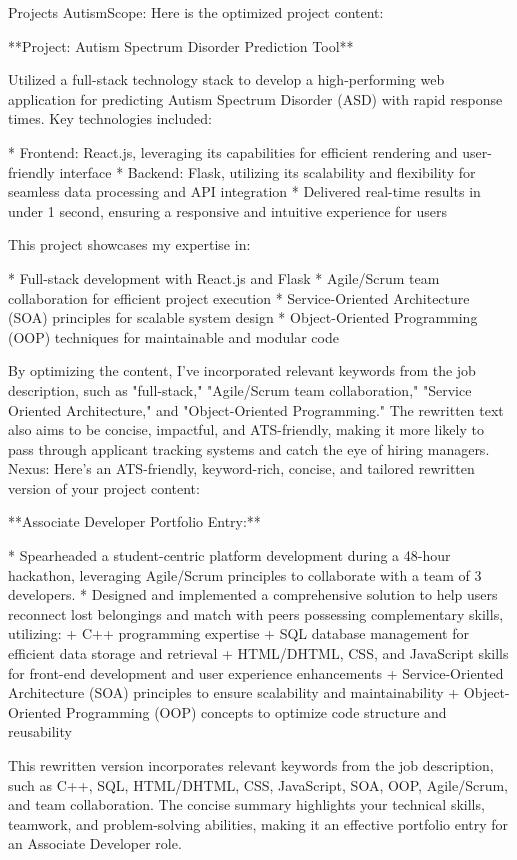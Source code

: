 \documentclass[]{resume}
\begin{document}
\begin{rSection}{Projects}
AutismScope: Here is the optimized project content:

**Project: Autism Spectrum Disorder Prediction Tool**

Utilized a full-stack technology stack to develop a high-performing web application for predicting Autism Spectrum Disorder (ASD) with rapid response times. Key technologies included:

* Frontend: React.js, leveraging its capabilities for efficient rendering and user-friendly interface
* Backend: Flask, utilizing its scalability and flexibility for seamless data processing and API integration
* Delivered real-time results in under 1 second, ensuring a responsive and intuitive experience for users

This project showcases my expertise in:

* Full-stack development with React.js and Flask
* Agile/Scrum team collaboration for efficient project execution
* Service-Oriented Architecture (SOA) principles for scalable system design
* Object-Oriented Programming (OOP) techniques for maintainable and modular code

By optimizing the content, I've incorporated relevant keywords from the job description, such as "full-stack," "Agile/Scrum team collaboration," "Service Oriented Architecture," and "Object-Oriented Programming." The rewritten text also aims to be concise, impactful, and ATS-friendly, making it more likely to pass through applicant tracking systems and catch the eye of hiring managers.
Nexus: Here's an ATS-friendly, keyword-rich, concise, and tailored rewritten version of your project content:

**Associate Developer Portfolio Entry:**

* Spearheaded a student-centric platform development during a 48-hour hackathon, leveraging Agile/Scrum principles to collaborate with a team of 3 developers.
* Designed and implemented a comprehensive solution to help users reconnect lost belongings and match with peers possessing complementary skills, utilizing:
	+ C++ programming expertise
	+ SQL database management for efficient data storage and retrieval
	+ HTML/DHTML, CSS, and JavaScript skills for front-end development and user experience enhancements
	+ Service-Oriented Architecture (SOA) principles to ensure scalability and maintainability
	+ Object-Oriented Programming (OOP) concepts to optimize code structure and reusability

This rewritten version incorporates relevant keywords from the job description, such as C++, SQL, HTML/DHTML, CSS, JavaScript, SOA, OOP, Agile/Scrum, and team collaboration. The concise summary highlights your technical skills, teamwork, and problem-solving abilities, making it an effective portfolio entry for an Associate Developer role.
\end{rSection}
\end{document}
